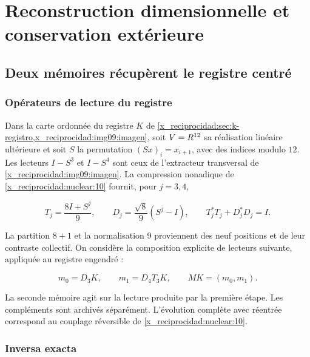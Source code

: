 \chapter{Reconstruction dimensionnelle et conservation extérieure}
\label{x_reciprocidad:nuclear:11}
\section{Deux mémoires récupèrent le registre centré}

\subsection{Opérateurs de lecture du registre}

Dans la carte ordonnée du registre \(K\) de
\cref{x_reciprocidad:sec:k-registro,x_reciprocidad:img09:imagen}, soit \(V=R^{12}\) sa
réalisation linéaire ultérieure et soit \(S\) la permutation
\((Sx)_i=x_{i+1}\), avec des indices modulo \(12\).
Les lecteurs \(I-S^3\) et \(I-S^4\) sont ceux de l’extracteur transversal
de \cref{x_reciprocidad:img09:imagen}.
La compression nonadique de \cref{x_reciprocidad:nuclear:10} fournit,
pour \(j=3,4\),




\begin{equation}
T_j=\frac{8I+S^j}{9},\qquad D_j=\frac{\sqrt8}{9}(S^j-I),
\qquad T_j^*T_j+D_j^*D_j=I.
\label{x_reciprocidad:nuc11:eq:1}
\end{equation}



La partition \(8+1\) et la normalisation \(9\) proviennent des neuf
positions et de leur contraste collectif.
On considère la composition explicite de lecteurs suivante,
appliquée au registre engendré :



\begin{equation}
m_0=D_3K,\qquad m_1=D_4T_3K,
\qquad M K=(m_0,m_1).
\label{x_reciprocidad:nuc11:eq:2}
\end{equation}



La seconde mémoire agit sur la lecture produite par la première
étape. Les compléments sont archivés séparément.
L’évolution complète avec réentrée correspond au couplage
réversible de \cref{x_reciprocidad:nuclear:10}.

\subsection{Inversa exacta}

